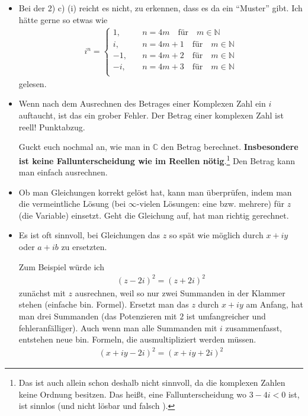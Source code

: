\documentclass[11pt, a4paper]{article}
\newcommand{\C}{\mathbb{C}}
\newcommand{\N}{\mathbb{N}}
\begin{document}
\begin{itemize}
\item Bei der 2) c) (i) reicht es nicht, zu erkennen, dass es da ein \enquote{Muster} gibt. Ich hätte gerne so etwas wie
\begin{align*}
i^n = \begin{cases}
1, \quad &n = 4m		\quad  \text{für}\quad m \in \N\\
i, \quad &n = 4m + 1	\quad  \text{für}\quad m \in \N\\
-1, \quad &n = 4m + 2 	\quad  \text{für}\quad m \in \N\\
-i, \quad &n = 4m + 3	\quad  \text{für}\quad m \in \N\\
\end{cases}
\end{align*}
gelesen.

\item Wenn nach dem Ausrechnen des Betrages einer Komplexen Zahl ein $i$ auftaucht, ist das ein grober Fehler. Der Betrag einer komplexen Zahl ist reell! Punktabzug.

Guckt euch nochmal an, wie man in $\C$ den Betrag berechnet. \textbf{Insbesondere ist keine Fallunterscheidung wie im Reellen nötig}.\footnote{Das ist auch allein schon deshalb nicht sinnvoll, da die komplexen Zahlen keine Ordnung besitzen. Das heißt, eine Fallunterscheidung wo $3 - 4i < 0$ ist, ist sinnlos (und nicht lösbar und falsch \smiley{}).} Den Betrag kann man einfach ausrechnen. 

\item Ob man Gleichungen korrekt gelöst hat, kann man überprüfen, indem man die vermeintliche Lösung (bei $\infty$-vielen Lösungen: eine bzw. mehrere) für $z$ (die Variable) einsetzt. Geht die Gleichung auf, hat man richtig gerechnet.

\item Es ist oft sinnvoll, bei Gleichungen das $z$ so spät wie möglich durch $x + iy$ oder $a + ib$ zu ersetzten.

Zum Beispiel würde ich 
\begin{align*}
(z -2i)^2 = (z + 2i)^2
\end{align*}
zunächst mit $z$ ausrechnen, weil so nur zwei Summanden in der Klammer stehen (einfache bin. Formel). Ersetzt man das $z$ durch $x + iy$ am Anfang, hat man drei Summanden (das Potenzieren mit $2$ ist umfangreicher und fehleranfälliger). Auch wenn man alle Summanden mit $i$ zusammenfasst, entstehen neue bin. Formeln, die ausmultipliziert werden müssen.
\begin{align*}
(x + iy -2i)^2 = (x + iy + 2i)^2
\end{align*}


\end{itemize}
\end{document}
